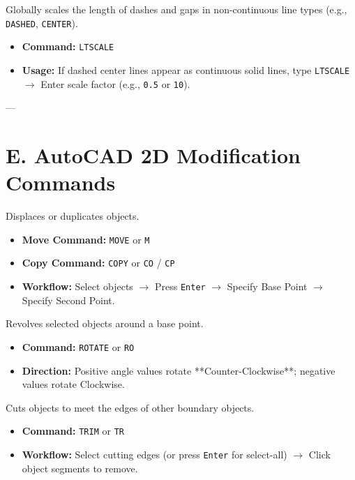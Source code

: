 \begin{autocadcmd}[LTSCALE]
Globally scales the length of dashes and gaps in non-continuous line types (e.g., \texttt{DASHED}, \texttt{CENTER}).
\begin{itemize}
    \item \textbf{Command:} \texttt{LTSCALE}
    \item \textbf{Usage:} If dashed center lines appear as continuous solid lines, type \texttt{LTSCALE} $\to$ Enter scale factor (e.g., \texttt{0.5} or \texttt{10}).
\end{itemize}
\end{autocadcmd}

---

\section{E. AutoCAD 2D Modification Commands}

\begin{autocadcmd}
Displaces or duplicates objects.
\begin{itemize}
    \item \textbf{Move Command:} \texttt{MOVE} or \texttt{M}
    \item \textbf{Copy Command:} \texttt{COPY} or \texttt{CO} / \texttt{CP}
    \item \textbf{Workflow:} Select objects $\to$ Press \texttt{Enter} $\to$ Specify Base Point $\to$ Specify Second Point.
\end{itemize}
\end{autocadcmd}

\begin{autocadcmd}[ROTATE]
Revolves selected objects around a base point.
\begin{itemize}
    \item \textbf{Command:} \texttt{ROTATE} or \texttt{RO}
    \item \textbf{Direction:} Positive angle values rotate **Counter-Clockwise**; negative values rotate Clockwise.
\end{itemize}
\end{autocadcmd}

\begin{autocadcmd}[TRIM]
Cuts objects to meet the edges of other boundary objects.
\begin{itemize}
    \item \textbf{Command:} \texttt{TRIM} or \texttt{TR}
    \item \textbf{Workflow:} Select cutting edges (or press \texttt{Enter} for select-all) $\to$ Click object segments to remove.
\end{itemize}
\end{autocadcmd}

